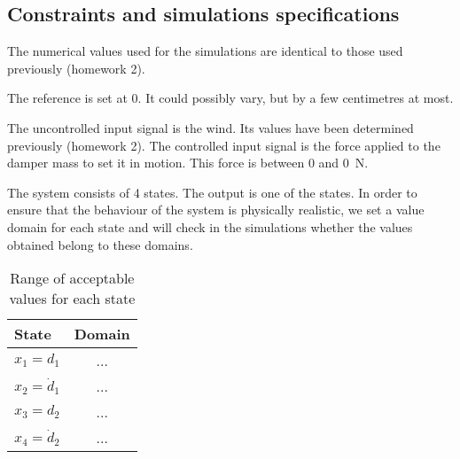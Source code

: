 \subsection{Constraints and simulations specifications}
The numerical values used for the simulations are identical to those used previously (homework 2).\par
The reference is set at $0$. It could possibly vary, but by a few centimetres at most.\par
The uncontrolled input signal is the wind. Its values have been determined previously (homework 2). The controlled input signal is the force applied to the damper mass to set it in motion. This force is between \num{0} and \SI{0}{\newton}.\par
The system consists of 4 states. The output is one of the states. In order to ensure that the behaviour of the system is physically realistic, we set a value domain for each state and will check in the simulations whether the values obtained belong to these domains.
\begin{table}[H]
    \centering
    \begin{tabular}{|l|c|}
        \hline
        {\bf State} & {\bf Domain}\\ \hline
        \hline
        $x_1 = d_1$ & ...\\ \hline
        $x_2 = \dot{d}_1$ & ...\\ \hline
        $x_3 = d_2$ & ...\\ \hline
        $x_4 = \dot{d}_2$ & ...\\ \hline
    \end{tabular}
    \caption{Range of acceptable values for each state}
\end{table}

